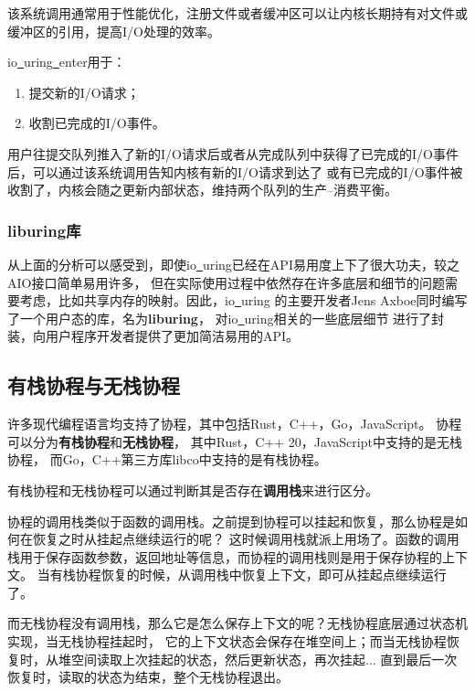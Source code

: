\documentclass[supercite]{HustGraduPaper}
\theoremstyle{definition}
\begin{document}
该系统调用通常用于性能优化，注册文件或者缓冲区可以让内核长期持有对文件或缓冲区的引用，提高I/O处理的效率。\par

io\underline{~}uring\underline{~}enter用于：
\begin{enumerate}[label={(\arabic*)}]
  \item 提交新的I/O请求；
  \item 收割已完成的I/O事件。
\end{enumerate}

用户往提交队列推入了新的I/O请求后或者从完成队列中获得了已完成的I/O事件后，可以通过该系统调用告知内核有新的I/O请求到达了
或有已完成的I/O事件被收割了，内核会随之更新内部状态，维持两个队列的生产--消费平衡。\par

\subsubsection{liburing库}
从上面的分析可以感受到，即使io\underline{~}uring已经在API易用度上下了很大功夫，较之AIO接口简单易用许多，
但在实际使用过程中依然存在许多底层和细节的问题需要考虑，比如共享内存的映射。因此，io\underline{~}uring
的主要开发者Jens Axboe同时编写了一个用户态的库，名为\textbf{liburing}，
对io\underline{~}uring相关的一些底层细节
进行了封装，向用户程序开发者提供了更加简洁易用的API。\par

\subsection{有栈协程与无栈协程}
许多现代编程语言均支持了协程，其中包括Rust，C++，Go，JavaScript。
协程可以分为\textbf{有栈协程}和\textbf{无栈协程}\cite{weber2022closer}，
其中Rust，C++ 20，JavaScript中支持的是无栈协程，
而Go，C++第三方库libco中支持的是有栈协程。\par

有栈协程和无栈协程可以通过判断其是否存在\textbf{调用栈}来进行区分。\par

协程的调用栈类似于函数的调用栈。之前提到协程可以挂起和恢复，那么协程是如何在恢复之时从挂起点继续运行的呢？
这时候调用栈就派上用场了。函数的调用栈用于保存函数参数，返回地址等信息，而协程的调用栈则是用于保存协程的上下文。
当有栈协程恢复的时候，从调用栈中恢复上下文，即可从挂起点继续运行了。\par

而无栈协程没有调用栈，那么它是怎么保存上下文的呢？无栈协程底层通过状态机实现，当无栈协程挂起时，
它的上下文状态会保存在堆空间上；而当无栈协程恢复时，从堆空间读取上次挂起的状态，然后更新状态，再次挂起...
直到最后一次恢复时，读取的状态为结束，整个无栈协程退出。\par
\end{document}

